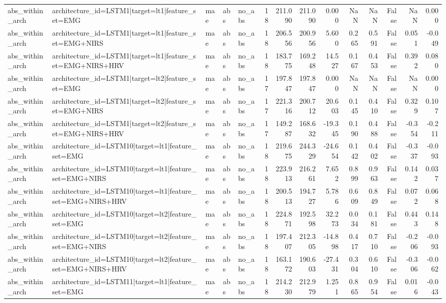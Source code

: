 \begin{table}
\begin{tabular}{lllllrrrrrrrrr}
abs_within_arch & architecture_id=LSTM1|target=lt1|feature_set=EMG & mae & abs & no_abs & 18 & 211.090 & 211.090 & 0.000 & NaN & NaN & False & NaN & 0.000 \\
abs_within_arch & architecture_id=LSTM1|target=lt1|feature_set=EMG+NIRS & mae & abs & no_abs & 18 & 206.556 & 200.956 & 5.600 & 0.265 & 0.591 & False & 0.051 & -0.049 \\
abs_within_arch & architecture_id=LSTM1|target=lt1|feature_set=EMG+NIRS+HRV & mae & abs & no_abs & 18 & 183.775 & 169.248 & 14.527 & 0.167 & 0.453 & False & 0.392 & 0.080 \\
abs_within_arch & architecture_id=LSTM1|target=lt2|feature_set=EMG & mae & abs & no_abs & 17 & 197.847 & 197.847 & 0.000 & NaN & NaN & False & NaN & 0.000 \\
abs_within_arch & architecture_id=LSTM1|target=lt2|feature_set=EMG+NIRS & mae & abs & no_abs & 17 & 221.316 & 200.712 & 20.603 & 0.145 & 0.410 & False & 0.329 & 0.107 \\
abs_within_arch & architecture_id=LSTM1|target=lt2|feature_set=EMG+NIRS+HRV & mae & abs & no_abs & 17 & 149.287 & 168.632 & -19.345 & 0.190 & 0.488 & False & -0.354 & -0.211 \\
abs_within_arch & architecture_id=LSTM10|target=lt1|feature_set=EMG & mae & abs & no_abs & 18 & 219.675 & 244.329 & -24.654 & 0.142 & 0.402 & False & -0.337 & -0.093 \\
abs_within_arch & architecture_id=LSTM10|target=lt1|feature_set=EMG+NIRS & mae & abs & no_abs & 18 & 223.913 & 216.261 & 7.652 & 0.899 & 0.963 & False & 0.142 & 0.037 \\
abs_within_arch & architecture_id=LSTM10|target=lt1|feature_set=EMG+NIRS+HRV & mae & abs & no_abs & 18 & 200.513 & 194.727 & 5.786 & 0.609 & 0.849 & False & 0.072 & 0.068 \\
abs_within_arch & architecture_id=LSTM10|target=lt2|feature_set=EMG & mae & abs & no_abs & 18 & 224.871 & 192.598 & 32.273 & 0.034 & 0.181 & False & 0.443 & 0.148 \\
abs_within_arch & architecture_id=LSTM10|target=lt2|feature_set=EMG+NIRS & mae & abs & no_abs & 18 & 197.407 & 212.305 & -14.898 & 0.417 & 0.710 & False & -0.206 & -0.093 \\
abs_within_arch & architecture_id=LSTM10|target=lt2|feature_set=EMG+NIRS+HRV & mae & abs & no_abs & 18 & 163.172 & 190.603 & -27.431 & 0.304 & 0.610 & False & -0.306 & -0.062 \\
abs_within_arch & architecture_id=LSTM11|target=lt1|feature_set=EMG & mae & abs & no_abs & 18 & 214.230 & 212.979 & 1.251 & 0.865 & 0.954 & False & 0.016 & -0.043 \\

\end{tabular}
\end{table}
